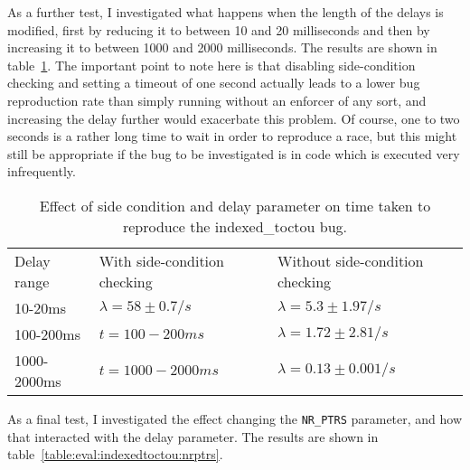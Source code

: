 As a further test, I investigated what happens when the length of the
delays is modified, first by reducing it to between 10 and 20
milliseconds and then by increasing it to between 1000 and 2000
milliseconds.  The results are shown in
table~\ref{table:eval:indexedtoctou:delay}.  The important point to
note here is that disabling side-condition checking and setting a
timeout of one second actually leads to a lower bug reproduction rate
than simply running without an enforcer of any sort, and increasing
the delay further would exacerbate this problem.  Of course, one to
two seconds is a rather long time to wait in order to reproduce a
race, but this might still be appropriate if the bug to be
investigated is in code which is executed very infrequently.

\begin{table}
\begin{tabular}{lll}
Delay range  & With side-condition checking          & Without side-condition checking \\
10-20ms      & $\lambda = 58 \pm 0.7/s$              & $\lambda = 5.3 \pm 1.97/s$ \\
100-200ms    & $t = 100 - 200ms$                     & $\lambda = 1.72 \pm 2.81/s$ \\
1000-2000ms  & $t = 1000 - 2000ms$                   & $\lambda = 0.13 \pm 0.001/s$ \\
\end{tabular}
\caption{Effect of side condition and delay parameter on time taken to
  reproduce the indexed\_toctou bug.}  
\label{table:eval:indexedtoctou:delay}
\end{table}

As a final test, I investigated the effect changing the \verb|NR_PTRS|
parameter, and how that interacted with the delay parameter.  The
results are shown in table~\ref{table:eval:indexedtoctou:nrptrs}.



